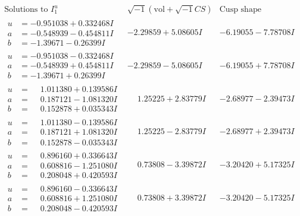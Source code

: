 \documentclass[1p]{elsarticle_modified}
\theoremstyle{definition}
\newcommand{\I}{\sqrt{-1}}
\begin{document}
$$\begin{array}{c|c|c}  
\text{Solutions to }I^u_{1}& \I (\text{vol} + \sqrt{-1}CS) & \text{Cusp shape}\\
 \hline 
\begin{aligned}
u &= -0.951038 + 0.332468 I \\
a &= -0.548939 - 0.454811 I \\
b &= -1.39671 - 0.26399 I\end{aligned}
 & -2.29859 + 5.08605 I & -6.19055 - 7.78708 I \\ \hline\begin{aligned}
u &= -0.951038 - 0.332468 I \\
a &= -0.548939 + 0.454811 I \\
b &= -1.39671 + 0.26399 I\end{aligned}
 & -2.29859 - 5.08605 I & -6.19055 + 7.78708 I \\ \hline\begin{aligned}
u &= \phantom{-}1.011380 + 0.139586 I \\
a &= \phantom{-}0.187121 - 1.081320 I \\
b &= \phantom{-}0.152878 + 0.035343 I\end{aligned}
 & \phantom{-}1.25225 + 2.83779 I & -2.68977 - 2.39473 I \\ \hline\begin{aligned}
u &= \phantom{-}1.011380 - 0.139586 I \\
a &= \phantom{-}0.187121 + 1.081320 I \\
b &= \phantom{-}0.152878 - 0.035343 I\end{aligned}
 & \phantom{-}1.25225 - 2.83779 I & -2.68977 + 2.39473 I \\ \hline\begin{aligned}
u &= \phantom{-}0.896160 + 0.336643 I \\
a &= \phantom{-}0.608816 - 1.251080 I \\
b &= \phantom{-}0.208048 + 0.420593 I\end{aligned}
 & \phantom{-}0.73808 - 3.39872 I & -3.20420 + 5.17325 I \\ \hline\begin{aligned}
u &= \phantom{-}0.896160 - 0.336643 I \\
a &= \phantom{-}0.608816 + 1.251080 I \\
b &= \phantom{-}0.208048 - 0.420593 I\end{aligned}
 & \phantom{-}0.73808 + 3.39872 I & -3.20420 - 5.17325 I \\ \hline\begin{aligned}

\end{aligned}
\end{array}$$
\end{document}
